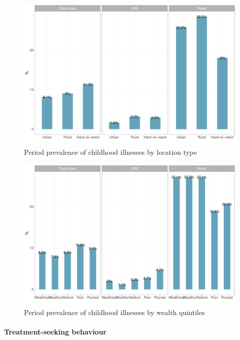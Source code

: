 \documentclass[12pt,a4paper]{article}
\let\oldparagraph\paragraph
\renewcommand{\paragraph}[1]{\oldparagraph{#1}\mbox{}}
\begin{document}
\begin{figure}[H]

{\centering \includegraphics{kayinReport_files/figure-latex/ill1plot-1} 

}

\caption{Period prevalence of childhood illnesses by location type}\label{fig:ill1plot}
\end{figure}

\begin{figure}[H]

{\centering \includegraphics{kayinReport_files/figure-latex/ill2plot-1} 

}

\caption{Period prevalence of childhood illnesses by wealth quintiles}\label{fig:ill2plot}
\end{figure}

\hypertarget{ctreatment}{%
\paragraph{Treatment-seeking behaviour}\label{ctreatment}}
\end{document}
